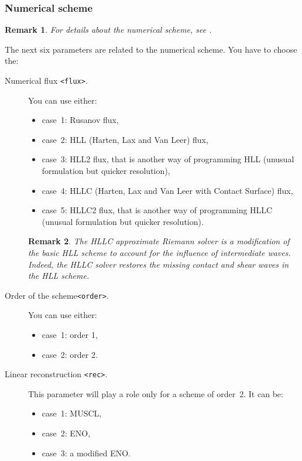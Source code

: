 \documentclass[a4paper, 11pt]{article}
\newtheorem{rmk}{Remark}
\begin{document}
\subsubsection{Numerical scheme}

\begin{rmk}
	For details about the numerical scheme, see \citet{Delestre14}.
\end{rmk}

The next six parameters are related to the numerical scheme.
You have to choose the:
\begin{description}
	\item[Numerical flux \texttt{<flux>}.] You can use either:
	      \begin{itemize}
		      \item case~1: Rusanov flux,
		      \item case~2: HLL (Harten, Lax and Van Leer) flux,
		      \item case~3: HLL2 flux, that is another way of programming HLL (unusual formulation but quicker resolution),
		      \item case~4: HLLC (Harten, Lax and Van Leer with Contact Surface) flux,
		      \item case~5: HLLC2 flux, that is another way of programming HLLC (unusual formulation but quicker resolution).
	      \end{itemize}
	      \begin{rmk}
		      The HLLC approximate Riemann solver is a modification of the basic HLL scheme to account for the influence of intermediate waves.
		      Indeed, the HLLC solver restores the missing contact and shear waves in the HLL scheme.
	      \end{rmk}
	\item[Order of the scheme\texttt{<order>}.] You can use either:
	      \begin{itemize}
		      \item case~1: order 1,
		      \item case~2: order 2.
	      \end{itemize}
	\item[Linear reconstruction \texttt{<rec>}.] This parameter will play a role only for a scheme of order~2.
	      It can be:
	      \begin{itemize}
		      \item case~1: MUSCL,
		      \item case~2: ENO,
		      \item case~3: a modified ENO\@.
	      \end{itemize}

\end{description}
\end{document}
